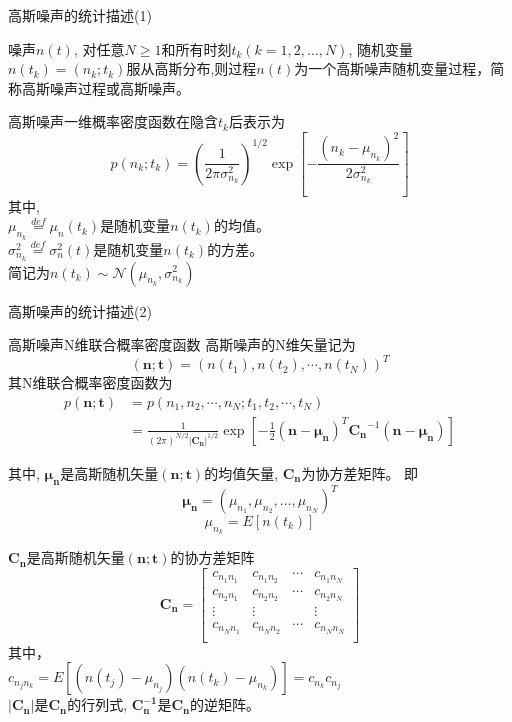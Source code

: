 \begin{frame}{高斯噪声的统计描述(1)}
\begin{definition}[高斯噪声]
	噪声$n(t)$, 对任意$N\ge 1$和所有时刻$t_k(k=1,2,\dots,N)$, 随机变量$n(t_k)=(n_k;t_k)$服从高斯分布,则过程$n(t)$为一个高斯噪声随机变量过程，简称高斯噪声过程或高斯噪声。
\end{definition}
\begin{block}{高斯噪声一维概率密度函数在隐含$t_k$后表示为}
	\[p(n_k;t_k)=(\frac{1}{2\pi\sigma_{n_k}^2})^{1/2}\exp\left[-\frac{(n_k-\mu_{n_k})^2}{2\sigma_{n_k}^2}\right] \]
	其中,\\
	$\mu_{n_k}\mathop{=}\limits^{def}\mu_n(t_k)$是随机变量$n(t_k)$的均值。\\
	$\sigma_{n_k}^2\mathop{=}\limits^{def}\sigma_n^2(t)$是随机变量$n(t_k)$的方差。\\
	简记为$n(t_k)\sim\mathcal{N}(\mu_{n_k},\sigma_{n_k}^2)$
\end{block}
\end{frame}

\begin{frame}{高斯噪声的统计描述(2)}
\begin{block}{高斯噪声N维联合概率密度函数}
高斯噪声的N维矢量记为
\[(\bm{n;t})=(n(t_1),n(t_2),\cdots,n(t_N))^T \]
其N维联合概率密度函数为
\begin{align*}
p(\bm{n;t})&=p(n_1,n_2,\cdots,n_N; t_1,t_2,\cdots,t_N)\\
&=\frac{1}{(2\pi)^{N/2}|\bm{C_n}|^{1/2}}\exp\left[-\frac{1}{2}(\bm{n-\mu_n})^T\bm{C_n}^{-1}(\bm{n-\mu_n})\right]
\end{align*}

其中, $\bm{\mu_{n}}$是高斯随机矢量$(\bm{n;t})$的均值矢量, $\bm{C_n}$为协方差矩阵。
即
$$\bm{\mu_n}=(\mu_{n_1},\mu_{n_2},\dots,\mu_{n_N})^T$$
$$\mu_{n_k}=E[n(t_k)]$$
\end{block}
\end{frame}

\begin{frame}
$\bm{C_n}$是高斯随机矢量$\bm{(n;t)}$的协方差矩阵
$$
\bm{C_n}=\left[
\begin{matrix}
c_{n_1n_1} & c_{n_1n_2} & \cdots &c_{n_1n_N} \\
c_{n_2n_1} & c_{n_2n_2} & \cdots &c_{n_2n_N} \\
\vdots     &  \vdots    &        &\vdots \\
c_{n_Nn_1} & c_{n_Nn_2} & \cdots &c_{n_Nn_N} \\
\end{matrix}
\right]
$$
其中，\\
$c_{n_jn_k}=E[(n(t_j)-\mu_{n_j})(n(t_k)-\mu_{n_k})]=c_{n_k}c_{n_j}$\\
$|\bm{C_n}|$是$\bm{C_n}$的行列式, $\bm{C_n^{-1}}$是$\bm{C_n}$的逆矩阵。
\end{frame}

